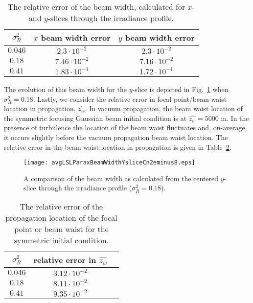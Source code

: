 \documentclass[9pt,twocolumn,twoside]{osajnl}
\begin{document}

\begin{table}[b!]
	\centering \vspace*{-3mm}
	\caption{The relative error of the beam width, calculated for $x$- and $y$-slices through the irradiance profile.} \label{tab:beamwidth_err}
	\begin{tabular}{ccc}
	\hline
	$\sigma_{R}^{2}$ 	& $x$ beam width error & $y$ beam width error\\
	\hline
	$0.046$ 		&   $2.3 \cdot 10^{-2}$             & $2.3 \cdot 10^{-2}$ \\
	$0.18$         &	$ 7.46 \cdot 10^{-2}$           & $ 7.16 \cdot 10^{-2}$ \\
	$0.41$          &   $ 1.83 \cdot 10^{-1}$           & $ 1.72 \cdot 10^{-1}$ \\
	\hline
	\end{tabular}
\end{table}


The evolution of this beam width for the $y$-slice is depicted in Fig.~\ref{fig:beamwidthcomp} when $\sigma_{R}^2=0.18$. Lastly, we consider the relative error in focal point/beam waist location in propagation, $\widehat{z_{w}}$. In vacuum propagation, the beam waist location of the symmetric focusing Gaussian beam initial condition is at $\widehat{z_{w}} = 5000$ m. In the presence of turbulence the location of the beam waist fluctuates and, on-average, it occurs slightly before the vacuum propagation beam waist location. The relative error in the beam waist location in propagation is given in Table~\ref{tab:beamwaistloc}.
 
\begin{figure}[t!]
	\centering
	\texttt{[image: avgLSLParaxBeamWidthYsliceCn2eminus8.eps]}
	\caption{A comparison of the beam width as calculated from the centered $y$-slice through the irradiance profile ($\sigma_{R}^2 = 0.18$).}\label{fig:beamwidthcomp} \vspace*{-3mm}
\end{figure}

\begin{table}[!b]
	\centering \vspace*{-3mm}
	\caption{The relative error of the propagation location of the focal point or beam waist for the symmetric initial condition. }\label{tab:beamwaistloc}
	\begin{tabular}{ccc}
		\hline 
		$\sigma_{R}^{2}$ 	& relative error in $\widehat{z_{w}}$ \\
		\hline
		$0.046$  	& $3.12 \cdot 10^{-2}$ \\
 		$0.18$ 		& $8.11 \cdot 10^{-2}$ \\ 
 		$0.41$      & $9.35 \cdot 10^{-2}$\\
 		\hline
	\end{tabular}
\end{table}
\end{document}

